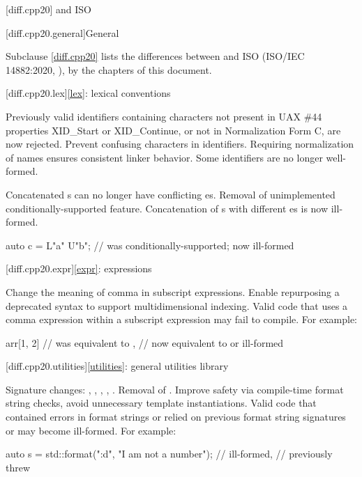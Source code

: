 
[diff.cpp20]{\Cpp{} and ISO \CppXX{}}

[diff.cpp20.general]{General}

\pnum
{}%
Subclause \ref{diff.cpp20} lists the differences between \Cpp{} and
ISO \CppXX{} (ISO/IEC 14882:2020, ),
by the chapters of this document.

[diff.cpp20.lex]{\ref{lex}: lexical conventions}

\change
Previously valid identifiers containing characters
not present in UAX \#44 properties XID_Start or XID_Continue, or
not in Normalization Form C, are now rejected.
\rationale
Prevent confusing characters in identifiers.
Requiring normalization of names ensures consistent linker behavior.
\effect
Some identifiers are no longer well-formed.

\change
Concatenated s can no longer have
conflicting es.
\rationale
Removal of unimplemented conditionally-supported feature.
\effect
Concatenation of s
with different es
is now ill-formed.
\begin{example}
\begin{codeblock}
auto c = L"a" U"b";             // was conditionally-supported; now ill-formed
\end{codeblock}
\end{example}

[diff.cpp20.expr]{\ref{expr}: expressions}

\change
Change the meaning of comma in subscript expressions.
\rationale
Enable repurposing a deprecated syntax to support multidimensional indexing.
\effect
Valid \CppXX{} code that uses a comma expression within a
subscript expression may fail to compile. For example:
\begin{codeblock}
arr[1, 2]               // was equivalent to ,
                        // now equivalent to  or ill-formed
\end{codeblock}

[diff.cpp20.utilities]{\ref{utilities}: general utilities library}

\change
Signature changes: , , ,
, .
Removal of .
\rationale
Improve safety via compile-time format string checks,
avoid unnecessary template instantiations.
\effect
Valid \CppXX{} code that
contained errors in format strings or
relied on previous format string signatures or
 may become ill-formed.
For example:
\begin{codeblock}
auto s = std::format("{:d}", "I am not a number");      // ill-formed,
                                                        // previously threw 
\end{codeblock}

